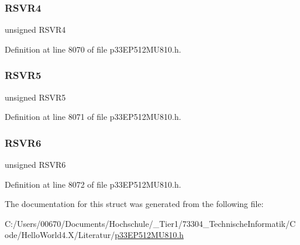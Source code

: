 \subsubsection{\texorpdfstring{R\+S\+V\+R4}{RSVR4}}
{\footnotesize\ttfamily unsigned R\+S\+V\+R4}



Definition at line 8070 of file p33\+E\+P512\+M\+U810.\+h.

\mbox{\label{structtag_r_p_i_n_r2_b_i_t_s_a10573537fd129782ea47fbddd9cf1533}} 
\subsubsection{\texorpdfstring{R\+S\+V\+R5}{RSVR5}}
{\footnotesize\ttfamily unsigned R\+S\+V\+R5}



Definition at line 8071 of file p33\+E\+P512\+M\+U810.\+h.

\mbox{\label{structtag_r_p_i_n_r2_b_i_t_s_acac217201849a2539cf5c0d3395ffd98}} 
\subsubsection{\texorpdfstring{R\+S\+V\+R6}{RSVR6}}
{\footnotesize\ttfamily unsigned R\+S\+V\+R6}



Definition at line 8072 of file p33\+E\+P512\+M\+U810.\+h.



The documentation for this struct was generated from the following file\+:\begin{DoxyCompactItemize}
\item 
C\+:/\+Users/00670/\+Documents/\+Hochschule/\+\_\+\+Tier1/73304\+\_\+\+Technische\+Informatik/\+Code/\+Hello\+World4.\+X/\+Literatur/\hyperlink{p33_e_p512_m_u810_8h}{p33\+E\+P512\+M\+U810.\+h}\end{DoxyCompactItemize}
